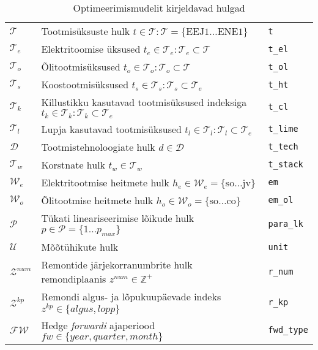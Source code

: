 \begin{table}
\begin{tabular}{l l l}
$\mathcal{T}$   & Tootmisüksuste hulk $t \in \mathcal{T}: \mathcal{T} = \{\mathrm{EEJ1}\dots \mathrm{ENE1}\}$ & \texttt{t}\\
$\mathcal{T}_e$ & Elektritoomise üksused $t_e \in \mathcal{T}_e: \mathcal{T}_e \subset \mathcal{T} $ & \texttt{t\_el} \\
$\mathcal{T}_o$ & Õlitootmisüksused $t_o \in \mathcal{T}_o: \mathcal{T}_o \subset \mathcal{T} $ & \texttt{t\_ol}\\
$\mathcal{T}_s$ & Koostootmisüksused $t_s \in \mathcal{T}_s: \mathcal{T}_s \subset \mathcal{T}_e $ & \texttt{t\_ht}\\
$\mathcal{T}_k$ & Killustikku kasutavad tootmisüksused indeksiga $t_k \in \mathcal{T}_k: \mathcal{T}_k \subset \mathcal{T}_e$ & \texttt{t\_cl} \\
$\mathcal{T}_l$ & Lupja kasutavad tootmisüksused $t_l \in \mathcal{T}_l: \mathcal{T}_l \subset \mathcal{T}_e $ & \texttt{t\_lime}\\
$\mathcal{D}$   & Tootmistehnoloogiate hulk $d \in \mathcal{D}$ & \texttt{t\_tech}\\
$\mathcal{T}_w$ & Korstnate hulk $t_w \in \mathcal{T}_w$ & \texttt{t\_stack}\\

$\mathcal{W}_e$ & Elektritootmise heitmete hulk $h_e \in \mathcal{W}_e = \{\mathrm{so}\dots \mathrm{jv}\}$ & \texttt{em}\\
$\mathcal{W}_o$ & Õlitootmise heitmete hulk $h_o \in \mathcal{W}_o = \{\mathrm{so}\dots \mathrm{co}\}$ & \texttt{em\_ol} \\
$\mathcal{P}$   & Tükati lineariseerimise lõikude hulk $p \in \mathcal{P} = \{1\dots p_{max}\}$ & \texttt{para\_lk} \\

$\mathcal{U}$   & Mõõtühikute hulk &\texttt{unit} \\
$\mathcal{Z}^{num}$ & Remontide järjekorranumbrite hulk remondiplaanis $z^{num} \in \mathbb{Z}^+$ & \texttt{r\_num} \\
$\mathcal{Z}^{kp}$  & Remondi algus- ja lõpukuupäevade indeks $z^{kp} \in \{algus, lopp\}$ & \texttt{r\_kp} \\ 
$\mathcal{FW}$ & Hedge \emph{forwardi} ajaperiood $fw \in \{year, quarter, month\}$ & \texttt{fwd\_type} \\
\end{tabular}
\caption{Optimeerimismudelit kirjeldavad hulgad \label{tab:hulgad}}
\end{table}